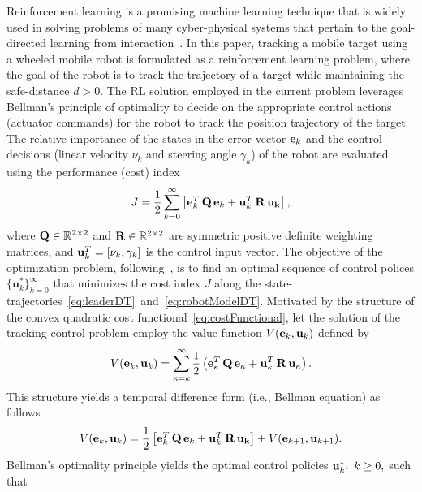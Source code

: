\documentclass[conference]{IEEEtran}
\begin{document}
 Reinforcement learning is a promising  machine learning technique that is widely used in solving problems of many cyber-physical systems that pertain to the goal-directed learning from interaction~\cite{sutton2020reinforcement}. In this paper, tracking a mobile target using a wheeled mobile robot is formulated as a reinforcement learning problem, where the goal of the robot is to track the trajectory of a target while maintaining the safe-distance $d>0.$ The RL solution employed in the current problem leverages Bellman's principle of optimality to decide on the appropriate control actions (actuator commands) for the robot to track the position trajectory of the target. The relative importance of the states in the error vector ${\bf e}_k$ and the control decisions (linear velocity $\nu_k$ and steering angle $\gamma_k$) of the robot are evaluated using the  performance (cost) index %
 \begin{align}
 \label{eq:costFunctional}
   J =  \frac{1}{2} \sum_{k=0}^\infty\left[{\bf e}_k^T \, {\bf Q} \, {\bf e}_k + {\bf u}_k^T \, {\bf R} \, {\bf u_k}\right],
 \end{align}
 where ${\bf Q}\in\mathbb{R}^{2\times 2}$ and ${\bf R}\in\mathbb{R}^{2\times 2}$ are symmetric positive definite weighting matrices, and ${\bf u}_k^T = [\nu_k,\gamma_k]$ is the control input vector.  The objective of the optimization problem, following~\cite{Lewis2013-Reinforcement}, is to find an optimal sequence of control polices $\{\mathbf{u}^*_k\}_{k=0}^\infty$ that minimizes the cost index $J$ along the state-trajectories~\eqref{eq:leaderDT}~and~\eqref{eq:robotModelDT}. Motivated by the structure of the convex quadratic cost functional~\eqref{eq:costFunctional}, let the solution of the tracking control problem employ the value function $V({\bf e}_k,{\bf u}_k)$ defined by %
 \begin{equation*}
 \label{eq:valueFunction}
 V({\bf e}_k,{\bf u}_k) = \sum_{\kappa=k}^\infty \frac{1}{2}\left({\bf e}_\kappa^T\, {\bf Q}\, {\bf e}_\kappa + {\bf u}_\kappa^T \, {\bf R}\, {\bf u_\kappa}\right).
 \end{equation*}
 This structure yields a temporal difference form (i.e., Bellman equation) as follows
 \begin{equation*}
 \label{eq:tempraldiffeq}
 V({\bf e}_k,{\bf u}_k)= \frac{1}{2}\left[{\bf e}_k^T\, {\bf Q}\, {\bf e}_k + {\bf u}_k^T\, {\bf R}\, {\bf u_k}\right] +V({\bf e}_{k+1},{\bf u}_{k+1}).
 \end{equation*}
 Bellman's optimality principle yields the optimal control policies ${\bf u}_k^*,~k\ge 0,$ such that~\cite{Lewis2012} %
\end{document}

